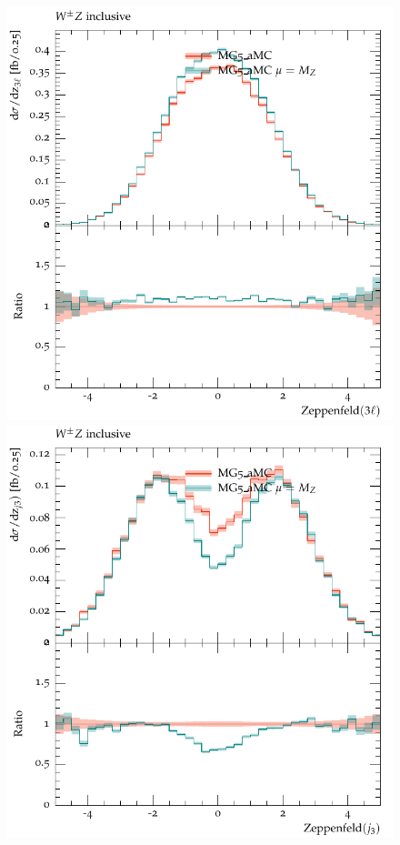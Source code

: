 \documentclass[11pt]{cernrep}
\begin{document}
\begin{figure}[htbp]
\begin{center}
   \includegraphics[scale=0.5]{figs/MG_zep3l}
   \includegraphics[scale=0.5]{figs/MG_zepj3}

\end{center}
\end{figure}
\end{document}

